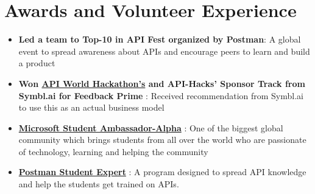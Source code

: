 \documentclass[letterpaper,11pt]{article}
\newcommand{\resumeItem}[1]{
  \item\small{
    {#1 \vspace{-2pt}}
  }
}
\newcommand{\resumeItemListStart}{\begin{itemize}}
\newcommand{\resumeItemListEnd}{\end{itemize}\vspace{-5pt}}
\begin{document}
\section{\textbf{Awards and Volunteer Experience} }
 \begin{itemize}[leftmargin=0.15in, label={}]
    \small{\item{
        \resumeItemListStart
                \resumeItem{\textbf{Led a team to {Top-10 in API Fest} organized by Postman}: A global event to spread awareness about APIs and encourage peers to learn and build a product}
                \resumeItem{\textbf{{Won \href{https://devpost.com/software/feedback-prime-kbg8um}{API World Hackathon's} and {API-Hacks'} Sponsor Track from Symbl.ai for Feedback Prime} }: Received recommendation from Symbl.ai to use this as an actual business model}
                \resumeItem{\textbf{\href{https://studentambassadors.microsoft.com/en-US/profile/124303}{Microsoft Student Ambassador-Alpha}} : One of the biggest global community which brings students from all over the world who are passionate of technology, learning and helping the community }
                \resumeItem{\textbf{\href{https://api.badgr.io/public/assertions/smxpDApNQkawRdyLq88rTA}{ Postman Student Expert}} : A program designed to spread API knowledge and help the students get trained on APIs.}
      \resumeItemListEnd
    }}
 \end{itemize}
 
 
\end{document}
